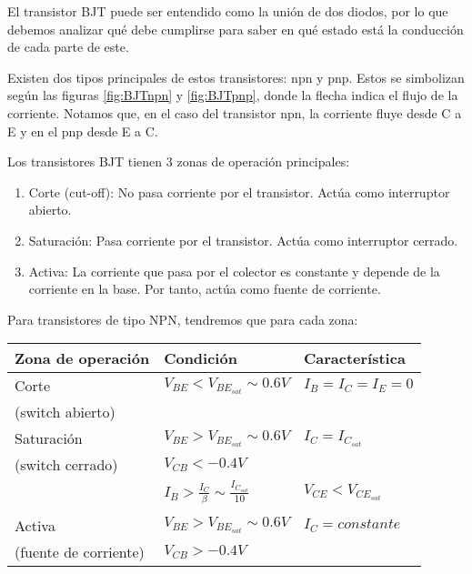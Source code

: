 \documentclass[11pt,fancy,lang=es]{elegantbook}
\begin{document}
El transistor BJT puede ser entendido como la unión de dos diodos, por lo que debemos analizar qué debe cumplirse para saber en qué estado está la conducción de cada parte de este.

Existen dos tipos principales de estos transistores: npn y pnp. Estos se simbolizan según las figuras \ref{fig:BJTnpn} y \ref{fig:BJTpnp}, donde la flecha indica el flujo de la corriente. Notamos que, en el caso del transistor npn, la corriente fluye desde C a E y en el pnp desde E a C.



Los transistores BJT tienen 3 zonas de operación principales:
\begin{enumerate}
    \item Corte (cut-off): No pasa corriente por el transistor. Actúa como interruptor abierto.
    \item Saturación: Pasa corriente por el transistor. Actúa como interruptor cerrado.
    \item Activa: La corriente que pasa por el colector es constante y depende de la corriente en la base. Por tanto, actúa como fuente de corriente.
\end{enumerate}



Para transistores de tipo NPN, tendremos que para cada zona:
\begin{table}
    \centering
    \begin{tabular}{|l|l|l|}
        Zona de operación     & Condición                                           & Característica        \\\hline
        Corte                 & $V_{BE}<V_{BE_{sat}}\sim0.6V$                       & $I_B=I_C=I_E=0$       \\
        (switch abierto)      &                                                     &                       \\\hline
        Saturación            & $V_{BE}>V_{BE_{sat}}\sim0.6V$                       & $I_C= I_{C_{sat}}$    \\
        (switch cerrado)      & $V_{CB}<-0.4V$                                      &                       \\
                              & $I_B>\frac{I_C}{\beta} \sim \frac{I_{C_{sat}}}{10}$ & $V_{CE}<V_{CE_{sat}}$ \\
                              &                                                     &                       \\ \hline
        Activa                & $V_{BE}>V_{BE_{sat}}\sim0.6V$                       & $I_C= constante$      \\
        (fuente de corriente) & $V_{CB}>-0.4V$                                      &                       \\
    \end{tabular}
\end{table}
\end{document}
